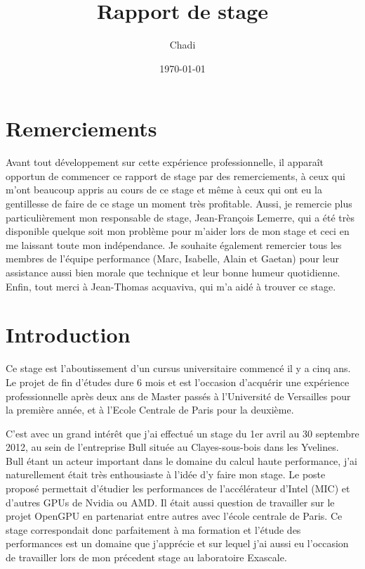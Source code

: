 \documentclass[11pt]{article}
\title{Rapport de stage}
\author{Chadi \bsc{AKEL}}
\date{\today}
\begin{document}
\pagestyle{fancy}
\lhead{\thepart}
\chead{}
\lfoot{}
\cfoot{\thepage}
\rfoot{}
\maketitle
\newpage
{}
\renewcommand{\contentsname}{Sommaire}
\tableofcontents

\newpage
\listoffigures

\newpage
{}
\part{Remerciements}
	Avant tout développement sur cette expérience professionnelle, il apparaît opportun de commencer ce rapport de stage par 
	des remerciements, à ceux qui m'ont beaucoup appris au cours de ce stage et même à ceux qui ont eu la gentillesse de faire 
	de ce stage un moment très profitable. Aussi, je remercie plus particulièrement mon responsable de stage, Jean-François Lemerre, 
	qui a été très disponible quelque soit mon problème pour m'aider lors de mon stage et ceci en me laissant toute mon 
	indépendance. \newline
	Je souhaite également remercier tous les membres de l'équipe performance (Marc, Isabelle, Alain et Gaetan) pour leur assistance 
	aussi bien morale que technique et leur bonne humeur quotidienne. \newline
	Enfin, tout merci à Jean-Thomas acquaviva, qui m'a aidé à trouver ce stage.

\newpage
{}
\part{Introduction}
	Ce stage est l'aboutissement d'un cursus universitaire commencé il y a cinq ans. Le projet de fin
	d'études dure 6 mois et est l'occasion d'acquérir une expérience professionnelle après deux ans
	de Master passés à l'Université de Versailles pour la première année, et à l'Ecole Centrale de Paris pour la deuxième. \newline

	C'est avec un grand intérêt que j’ai effectué un stage du 1er avril au 30 septembre 2012, au sein de l’entreprise Bull située au Clayes-sous-bois 
	dans les Yvelines. Bull étant un acteur important dans le domaine du calcul haute performance, j'ai naturellement 
	était très enthousiaste à l'idée d'y faire mon stage. Le poste proposé permettait d'étudier les performances de 
	l'accélérateur d'Intel (MIC) et d'autres GPUs de Nvidia ou AMD. Il était aussi question de travailler sur le projet 
	OpenGPU en partenariat entre autres avec l'école centrale de Paris. Ce stage correspondait donc parfaitement à ma formation et 
	l'étude des performances est un domaine que j'apprécie et sur lequel j'ai aussi eu l'occasion de travailler lors de 
	mon précedent stage au laboratoire Exascale. \newline
	
\end{document}
